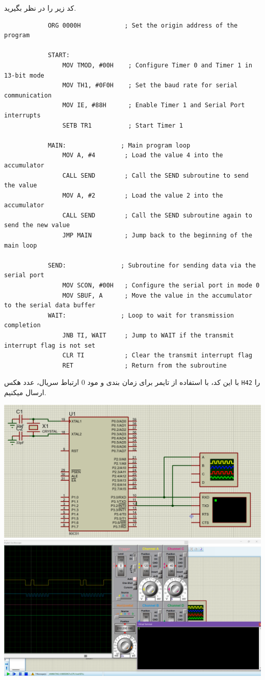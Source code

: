 \documentclass[11pt]{article}
\begin{document}
\begin{qsolve}[]
	کد زیر را در نظر بگیرید.
	\begin{latin}
		\begin{verbatim}
			ORG 0000H            ; Set the origin address of the program
			
			START:              
				MOV TMOD, #00H    ; Configure Timer 0 and Timer 1 in 13-bit mode
				MOV TH1, #0F0H    ; Set the baud rate for serial communication
				MOV IE, #88H      ; Enable Timer 1 and Serial Port interrupts
				SETB TR1          ; Start Timer 1
				
			MAIN:               ; Main program loop
				MOV A, #4        ; Load the value 4 into the accumulator
				CALL SEND        ; Call the SEND subroutine to send the value
				MOV A, #2        ; Load the value 2 into the accumulator
				CALL SEND        ; Call the SEND subroutine again to send the new value
				JMP MAIN         ; Jump back to the beginning of the main loop
				
			SEND:               ; Subroutine for sending data via the serial port
				MOV SCON, #00H   ; Configure the serial port in mode 0
				MOV SBUF, A      ; Move the value in the accumulator to the serial data buffer
			WAIT:               ; Loop to wait for transmission completion
				JNB TI, WAIT     ; Jump to WAIT if the transmit interrupt flag is not set
				CLR TI           ; Clear the transmit interrupt flag
				RET              ; Return from the subroutine
		\end{verbatim}
	\end{latin}

	 با این کد، با استفاده از تایمر برای زمان بندی و مود 0 ارتباط سریال، عدد هکس \texttt{H42} را 
	 ارسال میکنیم.

	 \begin{center}
		\includegraphics[width=0.48\linewidth]{result/p1_proteus.png}
		\includegraphics[width=0.48\linewidth]{result/p1_res.png}
	 \end{center}


\end{qsolve}
\end{document}
